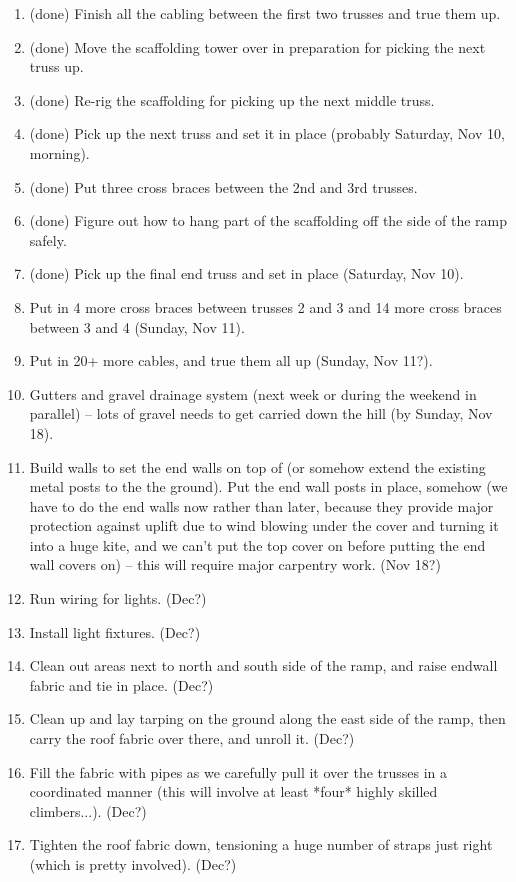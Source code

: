 \documentclass{article}
\begin{document}
\begin{enumerate}
\item (done) Finish all the cabling between the first two trusses and true them up.
\item (done) Move the scaffolding tower over in preparation for picking the next truss up.
\item (done) Re-rig the scaffolding for picking up the next middle truss.
\item (done) Pick up the next truss and set it in place (probably Saturday, Nov 10, morning).
\item (done) Put three cross braces between the 2nd and 3rd trusses.
\item (done) Figure out how to hang part of the scaffolding off the side of the ramp safely.
\item (done) Pick up the final end truss and set in place (Saturday, Nov 10).
\item Put in 4 more cross braces between trusses 2 and 3 and 14 more cross braces between 3 and 4 (Sunday, Nov 11).
\item Put in 20+ more cables, and true them all up (Sunday, Nov 11?).
\item Gutters and gravel drainage system (next week or during the weekend in parallel) -- lots of gravel needs to get carried down the hill (by Sunday, Nov 18).
\item Build walls to set the end walls on top of (or somehow extend the existing metal posts to the the ground). Put the end wall posts in place, somehow (we have to do the end walls now rather than later, because they provide major protection against uplift due to wind blowing under the cover and turning it into a huge kite, and we can't put the top cover on before putting the end wall covers on) -- this will require major carpentry work. (Nov 18?)
\item Run wiring for lights.    (Dec?)
\item Install light fixtures.   (Dec?)
\item Clean out areas next to north and south side of the ramp, and raise endwall fabric and tie in place. (Dec?)
\item Clean up and lay tarping on the ground along the east side of the ramp, then carry the roof fabric over there, and unroll it.  (Dec?)
\item Fill the fabric with pipes as we carefully pull it over the trusses in a coordinated manner (this will involve at least *four* highly skilled climbers...).  (Dec?)
\item Tighten the roof fabric down, tensioning a huge number of straps just right (which is pretty involved).  (Dec?)

\end{enumerate}
\end{document}
